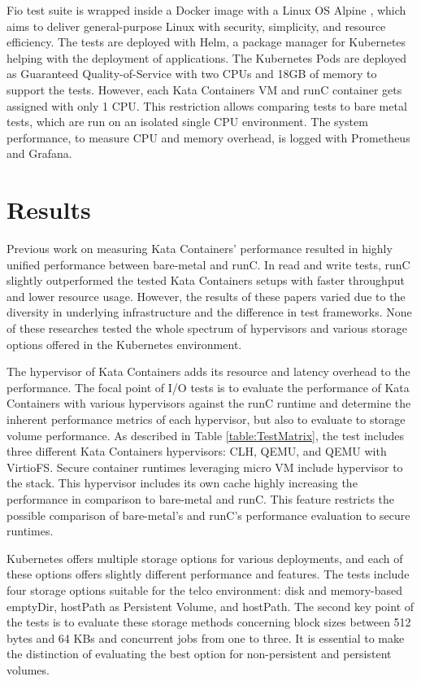 Fio test suite is wrapped inside a Docker image with a Linux OS Alpine \cite{Alpine}, which aims to deliver general-purpose Linux with security, simplicity, and resource efficiency. The tests are deployed with Helm\cite{Helm}, a package manager for Kubernetes helping with the deployment of applications. The Kubernetes Pods are deployed as Guaranteed Quality-of-Service with two CPUs and 18GB of memory to support the tests. However, each Kata Containers VM and runC container gets assigned with only 1 CPU. This restriction allows comparing tests to bare metal tests, which are run on an isolated single CPU environment. The system performance, to measure CPU and memory overhead, is logged with Prometheus and Grafana.

\section{Results}

Previous work \cite{EverartsdeVelp2020}\cite{Kumar2020}\cite{StackHPCKata}\cite{Randazzo2019} on measuring Kata Containers' performance resulted in highly unified performance between bare-metal and runC. In read and write tests, runC slightly outperformed the tested Kata Containers setups with faster throughput and lower resource usage. However, the results of these papers varied due to the diversity in underlying infrastructure and the difference in test frameworks. None of these researches tested the whole spectrum of hypervisors and various storage options offered in the Kubernetes environment.

The hypervisor of Kata Containers adds its resource and latency overhead to the performance. The focal point of I/O tests is to evaluate the performance of Kata Containers with various hypervisors against the runC runtime and determine the inherent performance metrics of each hypervisor, but also to evaluate to storage volume performance. As described in Table \ref{table:TestMatrix}, the test includes three different Kata Containers hypervisors: CLH, QEMU, and QEMU with VirtioFS. Secure container runtimes leveraging micro VM include hypervisor to the stack. This hypervisor includes its own cache highly increasing the performance in comparison to bare-metal and runC. This feature restricts the possible comparison of bare-metal's and runC's performance evaluation to secure runtimes.

Kubernetes offers multiple storage options for various deployments, and each of these options offers slightly different performance and features. The tests include four storage options suitable for the telco environment: disk and memory-based emptyDir, hostPath as Persistent Volume, and hostPath. The second key point of the tests is to evaluate these storage methods concerning block sizes between 512 bytes and 64 KBs and concurrent jobs from one to three. It is essential to make the distinction of evaluating the best option for non-persistent and persistent volumes.

